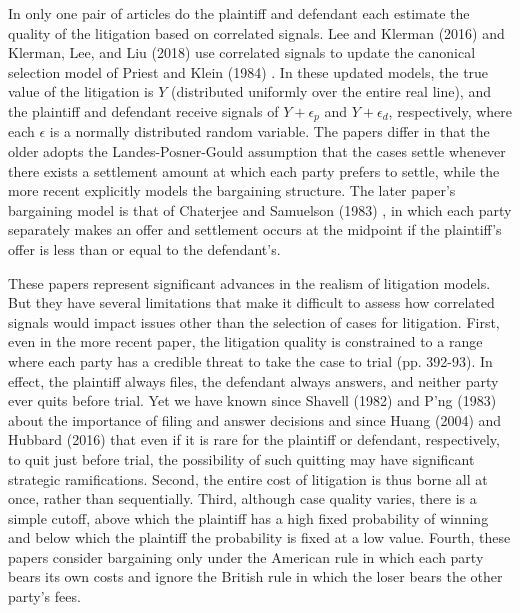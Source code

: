 \documentclass{article}
\begin{document}
In only one pair of articles do the plaintiff and defendant each estimate the quality of the litigation based on correlated signals. Lee and Klerman (2016) \cite{leeklerman} and Klerman, Lee, and Liu (2018) \cite{klermanleeliu} use correlated signals to update the canonical selection model of Priest and Klein (1984) \cite{priestklein}. In these updated models, the true value of the litigation is $Y$ (distributed uniformly over the entire real line), and the plaintiff and defendant receive signals of $Y + \epsilon_p$ and $Y + \epsilon_d$, respectively, where each $\epsilon$ is a normally distributed random variable. The papers differ in that the older adopts the Landes-Posner-Gould assumption that the cases settle whenever there exists a settlement amount at which each party prefers to settle, while the more recent explicitly models the bargaining structure. The later paper's bargaining model is that of Chaterjee and Samuelson (1983) \cite{chatterjeesamuelson}, in which each party separately makes an offer and settlement occurs at the midpoint if the plaintiff's offer is less than or equal to the defendant's. 

These papers represent significant advances in the realism of litigation models. But they have several limitations that make it difficult to assess how correlated signals would impact issues other than the selection of cases for litigation. First, even in the more recent paper, the litigation quality is constrained to a range where each party has a credible threat to take the case to trial (pp. 392-93). In effect, the plaintiff always files, the defendant always answers, and neither party ever quits before trial. Yet we have known since Shavell (1982) and P'ng (1983) about the importance of filing and answer decisions and since Huang (2004) \cite{huang} and Hubbard (2016) \cite{hubbard} that even if it is rare for the plaintiff or defendant, respectively, to quit just before trial, the possibility of such quitting may have significant strategic ramifications. Second, the entire cost of litigation is thus borne all at once, rather than sequentially. Third, although case quality varies, there is a simple cutoff, above which the plaintiff has a high fixed probability of winning and below which the plaintiff the probability is fixed at a low value. Fourth, these papers consider bargaining only under the American rule in which each party bears its own costs and ignore the British rule in which the loser bears the other party's fees. 
\end{document}
